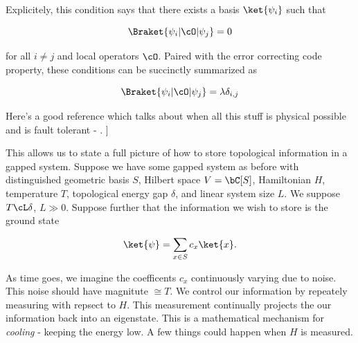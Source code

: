 Explicitely, this condition says that there exists a basis $\ket{\psi_i}$ such that

$$ \Braket{\psi_i | \cO | \psi_j}=0$$

for all $i\neq j$ and local operators $\cO$. Paired with the error correcting code property, these conditions can be succinctly summarized as 

$$ \Braket{\psi_i | \cO | \psi_j}=\lambda \delta_{i,j}$$

Here's a good reference which talks about when all this stuff is physical possible and is fault tolerant - \cite{knapp2016quickly}.
]

This allows us to state a full picture of how to store topological information in a gapped system. Suppose we have some gapped system as before with distinguished geometric basis $S$, Hilbert space $V=\bC[S]$, Hamiltonian $H$, temperature $T$, topological energy gap $\delta$, and linear system size $L$. We suppose $T\cL \delta$, $L\gg 0$. Suppose further that the information we wish to store is the ground state

$$\ket{\psi}=\sum_{x\in S}c_x \ket{x}.$$

As time goes, we imagine the coefficents $c_x$ continuously varying due to noise. This noise should have magnitute $\cong T$. We control our information by repeately measuring with repsect to $H$. This measurement continually projects the our information back into an eigenstate. This is a mathematical mechanism for \textit{cooling} - keeping the energy low. A few things could happen when $H$ is measured.

